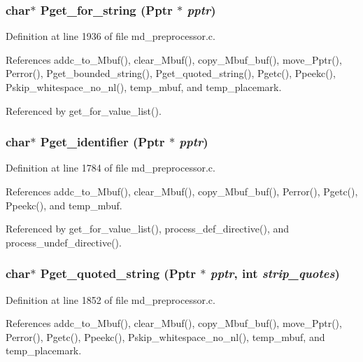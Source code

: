 \subsubsection{\setlength{\rightskip}{0pt plus 5cm}char$\ast$ Pget\_\-for\_\-string (\bf{Pptr} $\ast$ {\em pptr})}\label{md__preprocessor_8h_01d6d37758718ad06459891e48ecac32}




Definition at line 1936 of file md\_\-preprocessor.c.

References addc\_\-to\_\-Mbuf(), clear\_\-Mbuf(), copy\_\-Mbuf\_\-buf(), move\_\-Pptr(), Perror(), Pget\_\-bounded\_\-string(), Pget\_\-quoted\_\-string(), Pgetc(), Ppeekc(), Pskip\_\-whitespace\_\-no\_\-nl(), temp\_\-mbuf, and temp\_\-placemark.

Referenced by get\_\-for\_\-value\_\-list().
\subsubsection{\setlength{\rightskip}{0pt plus 5cm}char$\ast$ Pget\_\-identifier (\bf{Pptr} $\ast$ {\em pptr})}\label{md__preprocessor_8h_10640d24558b93d50dbd5118414cff80}




Definition at line 1784 of file md\_\-preprocessor.c.

References addc\_\-to\_\-Mbuf(), clear\_\-Mbuf(), copy\_\-Mbuf\_\-buf(), Perror(), Pgetc(), Ppeekc(), and temp\_\-mbuf.

Referenced by get\_\-for\_\-value\_\-list(), process\_\-def\_\-directive(), and process\_\-undef\_\-directive().
\subsubsection{\setlength{\rightskip}{0pt plus 5cm}char$\ast$ Pget\_\-quoted\_\-string (\bf{Pptr} $\ast$ {\em pptr}, int {\em strip\_\-quotes})}\label{md__preprocessor_8h_71c841602201ec9872d251a9445ba27b}




Definition at line 1852 of file md\_\-preprocessor.c.

References addc\_\-to\_\-Mbuf(), clear\_\-Mbuf(), copy\_\-Mbuf\_\-buf(), move\_\-Pptr(), Perror(), Pgetc(), Ppeekc(), Pskip\_\-whitespace\_\-no\_\-nl(), temp\_\-mbuf, and temp\_\-placemark.

